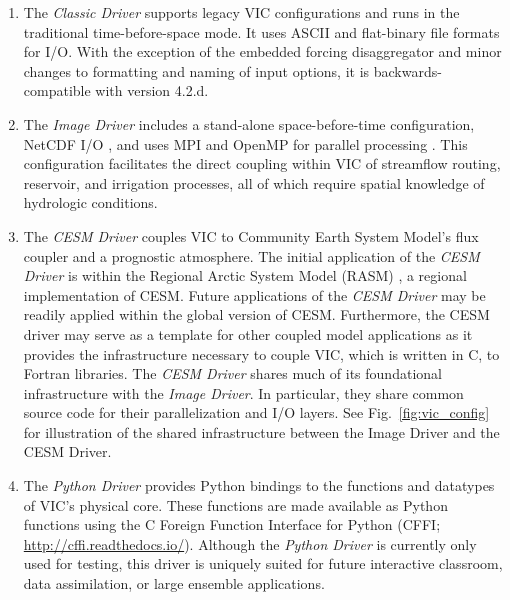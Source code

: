 \documentclass[gmd, manuscript]{copernicus}
\begin{document}
  \begin{enumerate}
    \item  The \textit{Classic Driver} supports legacy VIC configurations and runs in the traditional time-before-space mode. It uses ASCII and flat-binary file formats for I/O.  With the exception of the embedded forcing disaggregator and minor changes to formatting and naming of input options, it is backwards-compatible with version 4.2.d.

    \item The \textit{Image Driver} includes a stand-alone space-before-time configuration, NetCDF I/O \citep{Rew_1990}, and uses MPI and OpenMP for parallel processing \citep{Gropp_1996}. This configuration facilitates the direct coupling within VIC of streamflow routing, reservoir, and irrigation processes, all of which require spatial knowledge of hydrologic conditions.

    \item The \textit{CESM Driver} couples VIC to Community Earth System Model's \citep[CESM;][]{Hurrell_2013} flux coupler \citep[CPL7;][]{Craig_2012} and a prognostic atmosphere. The initial application of the \textit{CESM Driver} is within the Regional Arctic System Model (RASM) \citep{Hamman_2016a}, a regional implementation of CESM. Future applications of the \textit{CESM Driver} may be readily applied within the global version of CESM. Furthermore, the CESM driver may serve as a template for other coupled model applications as it provides the infrastructure necessary to couple VIC, which is written in C, to Fortran libraries. The \textit{CESM Driver} shares much of its foundational infrastructure with the \textit{Image Driver}. In particular, they share common source code for their parallelization and I/O layers. See Fig.~\ref{fig:vic_config} for illustration of the shared infrastructure between the Image Driver and the CESM Driver.

    \item The \textit{Python Driver} provides Python bindings to the functions and datatypes of VIC’s physical core. These functions are made available as Python functions using the C Foreign Function Interface for Python (CFFI; \url{http://cffi.readthedocs.io/}). Although the \textit{Python Driver} is currently only used for testing, this driver is uniquely suited for future interactive classroom, data assimilation, or large ensemble applications.

  \end{enumerate}
\end{document}
